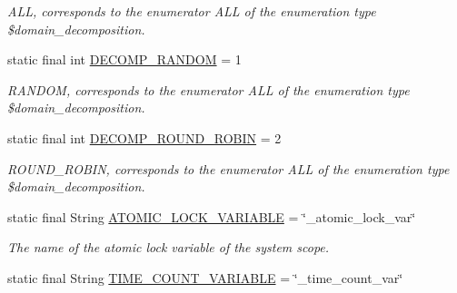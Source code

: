\begin{DoxyCompactItemize}
\begin{DoxyCompactList}\small\item\em A\+L\+L, corresponds to the enumerator A\+L\+L of the enumeration type \$domain\+\_\+decomposition. \end{DoxyCompactList}\item 
\hypertarget{classedu_1_1udel_1_1cis_1_1vsl_1_1civl_1_1model_1_1IF_1_1ModelConfiguration_a6adab3de3c7daa1967f3e18329dacf82}{}static final int \hyperlink{classedu_1_1udel_1_1cis_1_1vsl_1_1civl_1_1model_1_1IF_1_1ModelConfiguration_a6adab3de3c7daa1967f3e18329dacf82}{D\+E\+C\+O\+M\+P\+\_\+\+R\+A\+N\+D\+O\+M} = 1\label{classedu_1_1udel_1_1cis_1_1vsl_1_1civl_1_1model_1_1IF_1_1ModelConfiguration_a6adab3de3c7daa1967f3e18329dacf82}

\begin{DoxyCompactList}\small\item\em R\+A\+N\+D\+O\+M, corresponds to the enumerator A\+L\+L of the enumeration type \$domain\+\_\+decomposition. \end{DoxyCompactList}\item 
\hypertarget{classedu_1_1udel_1_1cis_1_1vsl_1_1civl_1_1model_1_1IF_1_1ModelConfiguration_a24679dd3ed3329428f9715f3085c2723}{}static final int \hyperlink{classedu_1_1udel_1_1cis_1_1vsl_1_1civl_1_1model_1_1IF_1_1ModelConfiguration_a24679dd3ed3329428f9715f3085c2723}{D\+E\+C\+O\+M\+P\+\_\+\+R\+O\+U\+N\+D\+\_\+\+R\+O\+B\+I\+N} = 2\label{classedu_1_1udel_1_1cis_1_1vsl_1_1civl_1_1model_1_1IF_1_1ModelConfiguration_a24679dd3ed3329428f9715f3085c2723}

\begin{DoxyCompactList}\small\item\em R\+O\+U\+N\+D\+\_\+\+R\+O\+B\+I\+N, corresponds to the enumerator A\+L\+L of the enumeration type \$domain\+\_\+decomposition. \end{DoxyCompactList}\item 
\hypertarget{classedu_1_1udel_1_1cis_1_1vsl_1_1civl_1_1model_1_1IF_1_1ModelConfiguration_a1896f694190f4d95926aa5cc8e33a314}{}static final String \hyperlink{classedu_1_1udel_1_1cis_1_1vsl_1_1civl_1_1model_1_1IF_1_1ModelConfiguration_a1896f694190f4d95926aa5cc8e33a314}{A\+T\+O\+M\+I\+C\+\_\+\+L\+O\+C\+K\+\_\+\+V\+A\+R\+I\+A\+B\+L\+E} = \char`\"{}\+\_\+atomic\+\_\+lock\+\_\+var\char`\"{}\label{classedu_1_1udel_1_1cis_1_1vsl_1_1civl_1_1model_1_1IF_1_1ModelConfiguration_a1896f694190f4d95926aa5cc8e33a314}

\begin{DoxyCompactList}\small\item\em The name of the atomic lock variable of the system scope. \end{DoxyCompactList}\item 
\hypertarget{classedu_1_1udel_1_1cis_1_1vsl_1_1civl_1_1model_1_1IF_1_1ModelConfiguration_ade8e63418f5f16d502e812806ddd592b}{}static final String \hyperlink{classedu_1_1udel_1_1cis_1_1vsl_1_1civl_1_1model_1_1IF_1_1ModelConfiguration_ade8e63418f5f16d502e812806ddd592b}{T\+I\+M\+E\+\_\+\+C\+O\+U\+N\+T\+\_\+\+V\+A\+R\+I\+A\+B\+L\+E} = \char`\"{}\+\_\+time\+\_\+count\+\_\+var\char`\"{}\label{classedu_1_1udel_1_1cis_1_1vsl_1_1civl_1_1model_1_1IF_1_1ModelConfiguration_ade8e63418f5f16d502e812806ddd592b}


\end{DoxyCompactItemize}
